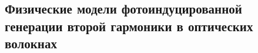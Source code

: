 \subsection{Физические модели фотоиндуцированной генерации второй гармоники в оптических волокнах}\label{subsec:dianov_antonyuk}




